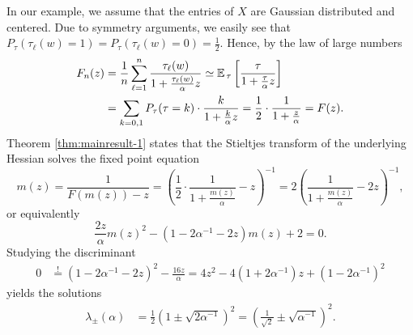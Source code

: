 \documentclass{article}
\begin{document}
\par
In our example, we assume that the entries of $X$ are Gaussian distributed and centered. Due to symmetry arguments, we easily see that $P_\tau(\tau_\ell(w)=1)=P_\tau(\tau_\ell(w)=0)=\frac{1}{2}$. Hence, by the law of large numbers
\begin{align}
F_n(z) &=\frac{1}{n}\sum_{\ell=1}^n\frac{\tau_\ell(w)}{1+\frac{\tau_\ell(w)}{\alpha}z} \simeq \mathbb{E}_{\,\tau}\left[\frac{\tau}{1+\frac{\tau}{\alpha}z}\right] \notag
\\ &= \sum_{k=0,1}P_\tau(\tau=k)\cdot\frac{k}{1+\frac{k}{\alpha}z} = \frac{1}{2}\cdot\frac{1}{1+\frac{z}{\alpha}} = F(z).
\end{align}
Theorem \ref{thm:mainresult-1} states that the Stieltjes transform of the underlying Hessian solves the fixed point equation
\begin{equation}
m(z)=\frac{1}{F(m(z))-z}=\left(\frac{1}{2}\cdot\frac{1}{1+\frac{m(z)}{\alpha}}-z\right)^{-1}=2\left(\frac{1}{1+\frac{m(z)}{\alpha}}-2z\right)^{-1},
\end{equation}
or equivalently
\begin{equation}
\frac{2z}{\alpha}m(z)^2-(1-2\alpha^{-1}-2z)m(z)+2=0.\label{eq:ReLU-fix}
\end{equation}
Studying the discriminant
\begin{align}
0 &\stackrel{!}{=} (1-2\alpha^{-1}-2z)^2-\frac{16z}{\alpha} = 4z^2-4(1+2\alpha^{-1})z+(1-2\alpha^{-1})^2
\end{align}
yields the solutions
\begin{align}
\lambda_\pm(\alpha) &= \frac{1}{2}(1\pm\sqrt{2\alpha^{-1}})^2 = \left(\frac{1}{\sqrt{2}}\pm\sqrt{\alpha^{-1}}\right)^2.
\end{align}
\bigskip
\end{document}
